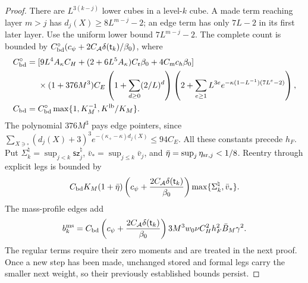 \documentclass[11pt,letterpaper,reqno]{amsart}
\theoremstyle{definition}
\theoremstyle{remark}
\begin{document}
\begin{proof}
There are $L^{3(k-j)}$ lower cubes in a level-$k$
cube. A made term reaching layer $m>j$ has
$d_j(X)\ge8L^{m-j}-2$; an edge term has only
$7L-2$ in its first later layer. Use the uniform
lower bound $7L^{m-j}-2$. The complete count is
bounded by
$C_{\rm bd}^{\circ}
(c_\psi+2C_{\mathcal A}\delta(\mathsf t_k)/\beta_0)$,
where
\[
\begin{split}
 C_{\rm bd}^{\circ}={}&
 [9L^4A_\kappa C_H+(2+6L^5A_\kappa)C_{\mathfrak r}\beta_0
                         +4C_{\rm m}c_h\beta_0]\\
 &\times(1+376M^3)C_E
 \left(1+\sum_{d\ge0}(2/L)^d\right)
 \left(2+\sum_{e\ge1}L^{3e}
       e^{-\kappa(1-L^{-1})(7L^e-2)}\right),\\
 C_{\rm bd}={}&C_{\rm bd}^{\circ}
                    \max\{1,K_M^{-1},K^{\rm lb}/K_M\}.
\end{split}
\]
The polynomial $376M^3$ pays edge pointers, since
$\sum_{X\ni\square}(d_j(X)+3)^3
e^{-(\kappa_+-\kappa)d_j(X)}\le94C_E$.
All these constants precede $h_F$.
Put $\Sigma_k^\natural=\sup_{j<k}\mathsf{sz}_j^\natural$,
$\bar v_*=\sup_{j\le k}\bar v_j$, and
$\bar\eta=\sup_j\eta_{{\rm sr},j}<1/8$.
Reentry through explicit legs is bounded by
\begin{equation}\label{eq:qcd-boundary-contraction}
 C_{\rm bd}K_M(1+\bar\eta)
 \left(c_\psi+\frac{2C_{\mathcal A}\delta(\mathsf t_k)}{\beta_0}\right)
             \max\{\Sigma_k^\natural,\bar v_*\}.
\end{equation}
The mass-profile edges add
\[
 b_k^{\rm ms}
 =C_{\rm bd}\left(c_\psi+
       \frac{2C_{\mathcal A}\delta(\mathsf t_k)}{\beta_0}\right)
       3M^3w_0\nu C_H^2h_F^2\bar B_M\gamma^2.
\]
The regular terms require their zero moments and are
treated in the next proof. Once a new step has been
made, unchanged stored and formal legs carry the
smaller next weight, so their previously established
bounds persist.
\end{proof}
\end{document}
